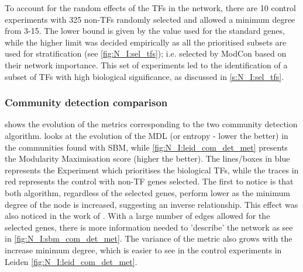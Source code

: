 To account for the random effects of the TFs in the network, there are 10 control experiments with 325 non-TFs randomly selected and allowed a minimum degree from 3-15. The lower bound is given by the value used for the standard genes, while the higher limit was decided empirically as all the prioritised subsets are used for stratification (see \cref{fig:N_I:sel_tfs}); i.e. selected by ModCon based on their network importance. This set of experiments led to the identification of a subset of TFs with high biological significance, as discussed in \cref{s:N_I:sel_tfs}.


\subsubsection{Community detection comparison}

 shows the evolution of the metrics corresponding to the two community detection algorithm.  looks at the evolution of the MDL (or entropy - lower the better) in the communities found with SBM, while \cref{fig:N_I:leid_com_det_met} presents the Modularity Maximisation score (higher the better). The lines/boxes in blue represents the Experiment which prioritises the biological TFs, while the traces in red represents the control with non-TF genes selected. The first to notice is that both algorithm, regardless of the selected genes, perform lower as the minimum degree of the node is increased, suggesting an inverse relationship. This effect was also noticed in the work of \citet{Care2019-ij}. With a large number of edges allowed for the selected genes, there is more information needed to 'describe' the network as see in \cref{fig:N_I:sbm_com_det_met}. The variance of the metric also grows with the increase minimum degree, which is easier to see in the control experiments in Leiden \cref{fig:N_I:leid_com_det_met}.


